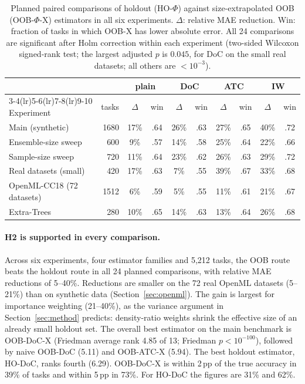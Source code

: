 \begin{table}[t]
\centering\small
\caption{Planned paired comparisons of holdout (HO-$\Phi$) against size-extrapolated OOB (OOB-$\Phi$-X) estimators in all six experiments. $\Delta$: relative MAE reduction. Win: fraction of tasks in which OOB-X has lower absolute error. All 24 comparisons are significant after Holm correction within each experiment (two-sided Wilcoxon signed-rank test; the largest adjusted $p$ is $0.045$, for DoC on the small real datasets; all others are $<10^{-3}$).}
\label{tab:paired}
\begin{tabular}{lrcccccccc}
\toprule
 & & \multicolumn{2}{c}{plain} & \multicolumn{2}{c}{DoC} & \multicolumn{2}{c}{ATC} & \multicolumn{2}{c}{IW}\\
\cmidrule(lr){3-4}\cmidrule(lr){5-6}\cmidrule(lr){7-8}\cmidrule(lr){9-10}
Experiment & tasks & $\Delta$ & win & $\Delta$ & win & $\Delta$ & win & $\Delta$ & win\\
\midrule
Main (synthetic) & 1680 & 17\% & .64 & 26\% & .63 & 27\% & .65 & 40\% & .72\\
Ensemble-size sweep & 600 & 9\% & .57 & 14\% & .58 & 25\% & .64 & 22\% & .66\\
Sample-size sweep & 720 & 11\% & .64 & 23\% & .62 & 26\% & .63 & 29\% & .72\\
Real datasets (small) & 420 & 17\% & .63 & 7\% & .55 & 39\% & .67 & 33\% & .68\\
OpenML-CC18 (72 datasets) & 1512 & 6\% & .59 & 5\% & .55 & 11\% & .61 & 21\% & .67\\
Extra-Trees & 280 & 10\% & .65 & 14\% & .63 & 13\% & .64 & 26\% & .68\\
\bottomrule
\end{tabular}
\end{table}

\paragraph{H2 is supported in every comparison.}
Across six experiments, four estimator families and 5{,}212 tasks, the OOB route beats the holdout route in all 24 planned comparisons, with relative MAE reductions of 5--40\%. Reductions are smaller on the 72 real OpenML datasets (5--21\%) than on synthetic data (Section~\ref{sec:openml}). The gain is largest for importance weighting (21--40\%), as the variance argument in Section~\ref{sec:method} predicts: density-ratio weights shrink the effective size of an already small holdout set. The overall best estimator on the main benchmark is OOB-DoC-X (Friedman average rank 4.85 of 13; Friedman $p<10^{-100}$), followed by naive OOB-DoC (5.11) and OOB-ATC-X (5.94). The best holdout estimator, HO-DoC, ranks fourth (6.29). OOB-DoC-X is within 2\,pp of the true accuracy in 39\% of tasks and within 5\,pp in 73\%. For HO-DoC the figures are 31\% and 62\%.

